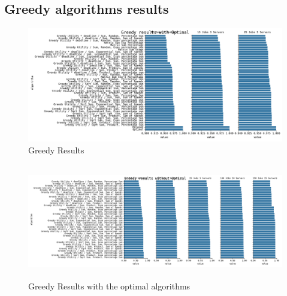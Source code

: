 \subsection{Greedy algorithms results}\label{subsec:greedy-algorithms-results}
\begin{figure}[H]
    \centering
    \includegraphics[width=1\linewidth, height=5cm]{./images/optimal_greedy_results.png}
    \caption{Greedy Results}
\end{figure}
\begin{figure}[H]
    \centering
    \includegraphics[width=1\linewidth, height=5cm]{./images/no_optimal_greedy_results.png}
    \caption{Greedy Results with the optimal algorithms}
\end{figure}